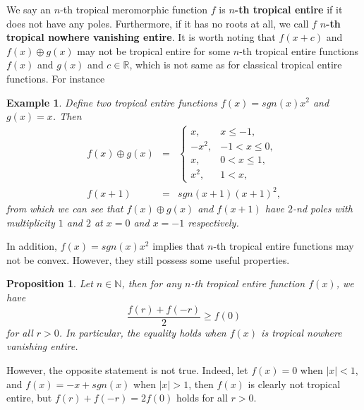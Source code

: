 \documentclass{article}
\newtheorem{proposition}[defin]{Proposition}
\newtheorem{exa}[defin]{Example}
\begin{document}
We say an $n$-th tropical meromorphic function $f$ is \textbf{$n$-th tropical entire} if it does not have any poles. Furthermore, if it has no roots at all, we call $f$ \textbf{$n$-th tropical nowhere vanishing entire}. It is worth noting that $f(x+c)$ and $f(x)\oplus g(x)$ may not be tropical entire for some $n$-th tropical entire functions $f(x)$ and $g(x)$ and $c\in \mathbb{R}$, which is not same as for classical tropical entire functions. For instance
\begin{exa}
    Define two tropical entire functions $f(x)=sgn(x)x^{2}$ and $g(x)=x$. Then
    \begin{eqnarray*}
        f(x)\oplus g(x)&=& \left\{\begin{array}{ll}
         x, & x\leq -1,\\
         -x^{2}, & -1< x \leq 0, \\
         x, & 0<x \leq 1, \\
         x^{2}, & 1 <x,
         \end{array}\right.\\
         f(x+1)&=&sgn(x+1)(x+1)^{2},
    \end{eqnarray*}
    from which we can see that $f(x)\oplus g(x)$ and $f(x+1)$ have $2$-nd poles with multiplicity $1$ and $2$ at $x=0$ and $x=-1$ respectively.
\end{exa}
In addition, $f(x)=sgn(x)x^{2}$ implies that $n$-th tropical entire functions may not be convex. However, they still possess some useful properties.
\begin{proposition}\label{p2.2}
    Let $n\in\mathbb{N}$, then for any $n$-th tropical entire function $f(x)$, we have
    \begin{equation}\label{2p2.2}
        \frac{f(r)+f(-r)}{2}\geq f(0)
    \end{equation}
    for all $r> 0$. In particular, the equality holds when $f(x)$ is tropical nowhere vanishing entire.
\end{proposition}
However, the opposite statement is not true. Indeed, let $f(x)=0$ when $|x|<1$, and $f(x)=-x+sgn(x)$ when $|x|>1$, then $f(x)$ is clearly not tropical entire, but $f(r)+f(-r)=2f(0)$ holds for all $r>0$.
\end{document}
